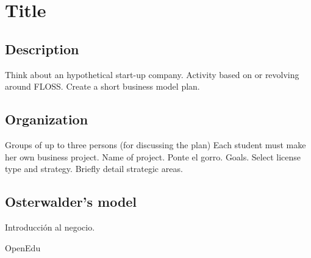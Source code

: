 \documentclass{article}
\begin{document}
\section{Title}


\subsection{Description}

Think about an hypothetical start-up company.
Activity based on or revolving around FLOSS.
Create a short business model plan.

\subsection{Organization}

Groups of up to three persons (for discussing the plan)
Each student must make her own business project.
Name of project. Ponte el gorro.
Goals.
Select license type and strategy.
Briefly detail strategic areas.

\subsection{Osterwalder's model}

Introducción al negocio.

OpenEdu
\end{document}
